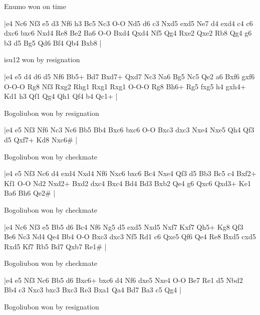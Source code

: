 \showboard

Enumo won on time

\makegametitle
|e4 Nc6 Nf3 e5 d3 Nf6 h3 Bc5 Nc3 O-O Nd5 d6 c3 Nxd5 exd5 Ne7 d4 exd4 c4 c6 dxc6 bxc6 Nxd4 Re8 Be2 Ba6 O-O Bxd4 Qxd4 Nf5 Qg4 Rxe2 Qxe2 Rb8 Qg4 g6 b3 d5 Bg5 Qd6 Bf4 Qb4 Bxb8  |

\showboard

isu12 won by resignation

\makegametitle
|e4 e5 d4 d6 d5 Nf6 Bb5+ Bd7 Bxd7+ Qxd7 Nc3 Na6 Bg5 Nc5 Qe2 a6 Bxf6 gxf6 O-O-O Rg8 Nf3 Rxg2 Rhg1 Rxg1 Rxg1 O-O-O Rg8 Bh6+ Rg5 fxg5 h4 gxh4+ Kd1 h3 Qf1 Qg4 Qh1 Qf4 b4 Qc1+  |

\showboard

Bogoliubon won by resignation

\makegametitle
|e4 e5 Nf3 Nf6 Nc3 Nc6 Bb5 Bb4 Bxc6 bxc6 O-O Bxc3 dxc3 Nxe4 Nxe5 Qh4 Qf3 d5 Qxf7+ Kd8 Nxc6\#  |

\showboard

Bogoliubon won by checkmate

\makegametitle
|e4 e5 Nf3 Nc6 d4 exd4 Nxd4 Nf6 Nxc6 bxc6 Bc4 Nxe4 Qf3 d5 Bb3 Bc5 c4 Bxf2+ Kf1 O-O Nd2 Nxd2+ Bxd2 dxc4 Bxc4 Bd4 Bd3 Bxb2 Qe4 g6 Qxc6 Qxd3+ Ke1 Ba6 Bh6 Qe2\#  |

\showboard

Bogoliubon won by checkmate

\makegametitle
|e4 Nc6 Nf3 e5 Bb5 d6 Bc4 Nf6 Ng5 d5 exd5 Nxd5 Nxf7 Kxf7 Qh5+ Kg8 Qf3 Be6 Nc3 Nd4 Qe4 Bb4 O-O Bxc3 dxc3 Nf5 Rd1 c6 Qxe5 Qf6 Qe4 Re8 Bxd5 cxd5 Rxd5 Kf7 Rb5 Bd7 Qxb7 Re1\#  |

\showboard

Bogoliubon won by checkmate

\makegametitle
|e4 e5 Nf3 Nc6 Bb5 d6 Bxc6+ bxc6 d4 Nf6 dxe5 Nxe4 O-O Be7 Re1 d5 Nbd2 Bb4 c3 Nxc3 bxc3 Bxc3 Re3 Bxa1 Qa4 Bd7 Ba3 c5 Qg4  |

\showboard

Bogoliubon won by resignation

